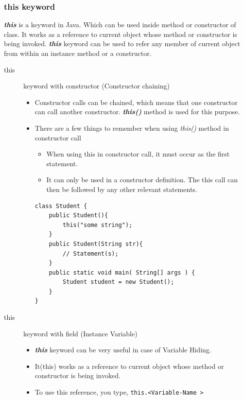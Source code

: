 \documentclass[11pt,a4paper]{article}
\begin{document}
\subsubsection*{this keyword}
 \emph{\textbf{this}}  is a keyword in Java. Which can be used inside method or constructor of  class. It works as a reference to current object whose method or constructor is being invoked.  \emph{\textbf{this}} keyword can be used to refer any member of current object from within an instance method or a constructor.


\begin{description}
 \item [this] keyword with constructor (Constructor chaining)
 \begin{itemize}
  \item Constructor calls can be chained, which means that one constructor can call another constructor. \emph{\textbf{this()}} method is used for this purpose.
  \item There are a few things to remember when using \emph{this()} method in constructor call
  \begin{itemize}
   \item When using this in constructor call, it must occur as the first statement.
   \item It can only be used in a constructor definition. The this call can then be followed by any other relevant statements.
  \end{itemize}
  
  \begin{lstlisting}
class Student {
    public Student(){
        this("some string");
    }
    public Student(String str){
        // Statement(s);
    }
    public static void main( String[] args ) {
        Student student = new Student();
    }
}
  \end{lstlisting}

\end{itemize}
 \item[this] keyword with field (Instance Variable)
 \begin{itemize}
  \item \emph{\textbf{this}} keyword can be very useful in case of Variable Hiding.
  \item It(this) works as a reference to current object whose method or constructor is being invoked.
  \item To use this reference, you type, \lstinline!this.<Variable-Name >!
    

\end{itemize}
\end{description}
\end{document}
